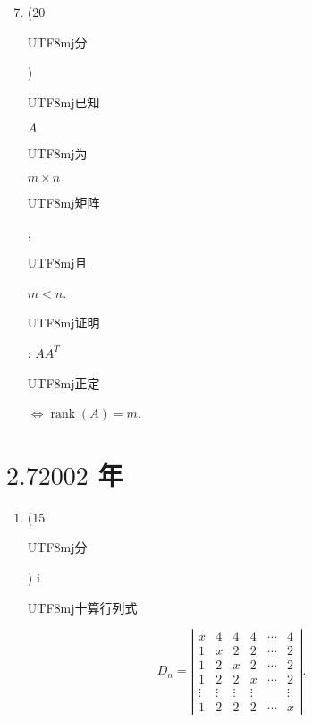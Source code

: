 \documentclass[10pt]{article}
\begin{document}
\begin{enumerate}
  \setcounter{enumi}{6}
  \item (20 \begin{CJK}{UTF8}{mj}分\end{CJK}) \begin{CJK}{UTF8}{mj}已知\end{CJK} $A$ \begin{CJK}{UTF8}{mj}为\end{CJK} $m \times n$ \begin{CJK}{UTF8}{mj}矩阵\end{CJK}, \begin{CJK}{UTF8}{mj}且\end{CJK} $m<n$. \begin{CJK}{UTF8}{mj}证明\end{CJK}: $A A^{T}$ \begin{CJK}{UTF8}{mj}正定\end{CJK} $\Leftrightarrow \operatorname{rank}(A)=m$.
\end{enumerate}
\section{$2.72002$ 年}
\begin{enumerate}
  \item (15 \begin{CJK}{UTF8}{mj}分\end{CJK}) i\begin{CJK}{UTF8}{mj}十算行列式\end{CJK}
\end{enumerate}
$$
D_{n}=\left|\begin{array}{cccccc}
x & 4 & 4 & 4 & \cdots & 4 \\
1 & x & 2 & 2 & \cdots & 2 \\
1 & 2 & x & 2 & \cdots & 2 \\
1 & 2 & 2 & x & \cdots & 2 \\
\vdots & \vdots & \vdots & \vdots & & \vdots \\
1 & 2 & 2 & 2 & \cdots & x
\end{array}\right| .
$$
\end{document}
